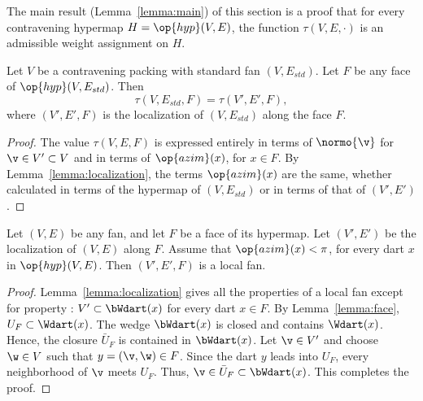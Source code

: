 The main result (Lemma~\ref{lemma:main}) of this section is a proof
that for every contravening hypermap $H=\op{hyp}(V,E)$, the function
$\tau(V,E,\cdot)$ is an admissible weight assignment on $H$.



\begin{lemma}[]  \label{lemma:tau-local}
  Let $V$ be a contravening packing with standard fan $(V,E_{std})$.
  Let $F$ be any face of $\op{hyp}(V,E_{std})$.  Then
\begin{displaymath}
\tau(V,E_{std},F) = \tau(V',E',F),
\end{displaymath}
where $(V',E',F)$ is the localization of $(V,E_{std})$ along the face $F$.
\end{lemma}

\begin{proof} The value $\tau(V,E,F)$ is expressed entirely in terms
  of $\normo{\v}$ for $\v\in V'\subset V$ and in terms of
  $\op{azim}(x)$, for $x\in F$.  By Lemma~\ref{lemma:localization},
  the terms $\op{azim}(x)$ are the same, whether calculated in terms
  of the hypermap of $(V,E_{std})$ or in terms of that of $(V',E')$.
\end{proof}


\begin{lemma}[] Let $(V,E)$ be any fan, and
  let $F$ be a face of its hypermap.  Let $(V',E')$ be the
  localization of $(V,E)$ along $F$.  Assume that $\op{azim}(x)<\pi$,
  for every dart $x$ in $\op{hyp}(V,E)$.  Then $(V',E',F)$ is a local
  fan.
\end{lemma}

\begin{proof}
  Lemma~\ref{lemma:localization} gives all the properties of a local
  fan except for property : $V'\subset \bWdart(x)$ for
  every dart $x\in F$.  By Lemma~\ref{lemma:face}, $U_F \subset
  \Wdart(x)$.  The wedge $\bWdart(x)$ is closed and contains
  $\Wdart(x)$. Hence, the closure $\bar U_F$ is contained in
  $\bWdart(x)$.  Let $\v\in V'$ and choose $\w\in V$ such that
  $y=(\v,\w)\in F$.
  Since the dart $y$ leads into $U_F$, every neighborhood of $\v$
  meets $U_F$.  Thus, $\v\in \bar U_F\subset \bWdart(x)$.  This
  completes the proof.
\end{proof}








